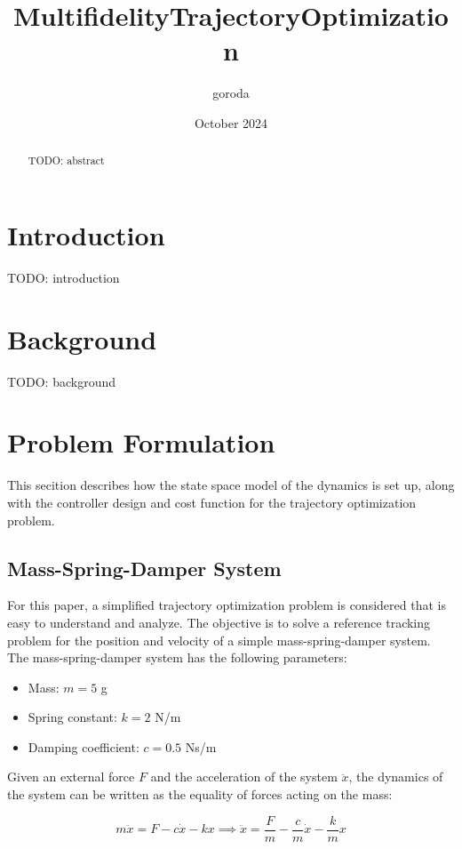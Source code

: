 \documentclass{article}
\title{MultifidelityTrajectoryOptimization}
\author{goroda }
\date{October 2024}
\begin{document}
\maketitle

\begin{abstract}
  TODO: abstract
\end{abstract}

\section{Introduction}
TODO: introduction
\section{Background}
TODO: background

\section{Problem Formulation}
This secition describes how the state space model of the dynamics is set up, along with the controller design and cost function for the trajectory optimization problem.
\subsection{Mass-Spring-Damper System}
For this paper, a simplified trajectory optimization problem is considered that is easy to understand and analyze.
The objective is to solve a reference tracking problem for the position and velocity of a simple mass-spring-damper system.
The mass-spring-damper system has the following parameters:
\begin{itemize}
  \item Mass: $m = 5$ g
  \item Spring constant: $k = 2$ N/m
  \item Damping coefficient: $c = 0.5$ Ns/m
\end{itemize}

Given an external force $F$ and the acceleration of the system $\ddot{x}$,
the dynamics of the system can be written as the equality of forces acting on the mass:

\begin{equation}
  m\ddot{x} = F - c\dot{x} - kx
  \implies \ddot{x} = \frac{F}{m} - \frac{c}{m}\dot{x} - \frac{k}{m}x
\end{equation}
\end{document}
